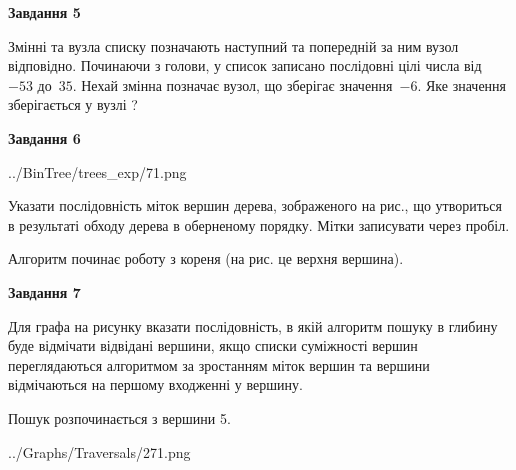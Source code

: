 \documentclass[12pt, ukrainian]{article}
\begin{document}
{\begin {large}
{\begin {center}\textbf{Завдання 5}\end {center}}\par
Змінні  та  вузла списку позначають наступний та попередній за ним вузол відповідно. Починаючи з голови, у список записано послідовні цілі числа від~$-53$ до~$35$. Нехай змінна  позначає вузол, що зберігає значення~$-6$.
Яке значення зберігається у вузлі  ?\par
\newpage

{\begin {center}\textbf{Завдання 6}\end {center}}\par

\begin{center}
	{../BinTree/trees_exp/71.png}
\end{center}
Указати послідовність міток вершин дерева, зображеного на рис., що утвориться в результаті обходу дерева в оберненому порядку. Мітки записувати через пробіл.\par Алгоритм починає роботу з кореня (на рис. це верхня вершина).\par
\newpage

{\begin {center}\textbf{Завдання 7}\end {center}}\par
Для графа на рисунку вказати послідовність, в якій алгоритм пошуку в глибину буде відмічати відвідані вершини, якщо списки суміжності вершин переглядаються алгоритмом за зростанням міток вершин та вершини відмічаються на першому вход\-женні у вершину.\par
Пошук розпочинається з вершини 5.\par

\begin{center}
	{../Graphs/Traversals/271.png}
\end{center}\par
\newpage


\end{large}}
\end{document}
